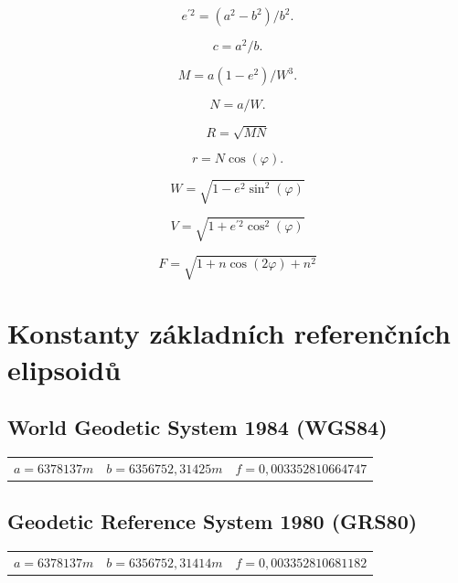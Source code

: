 \documentclass[11pt,a4paper]{article}
\begin{document}
\begin{appendices}
\begin{equation}
e^{'2} = (a^{2}-b^{2})/b^{2}.
\end{equation}

\begin{equation}
c = a^{2}/b.
\end{equation}

\begin{equation}
M = a\left(1-e^{2}\right) / W^{3}.
\end{equation}

\begin{equation}
N = a/W.
\end{equation}

\begin{equation}
R = \sqrt{M N}
\end{equation}

\begin{equation}
r = N\cos{\left(\varphi\right)}.
\end{equation}

\begin{equation}
W = \sqrt{1-e^{2}\sin^{2}{\left(\varphi\right)}}
\end{equation}

\begin{equation}
V = \sqrt{1+e^{'2}\cos^{2}{\left(\varphi\right)}}
\end{equation}

\begin{equation}
F = \sqrt{1+n\cos{\left(2\varphi\right)}+n^{2}}
\end{equation}

\section{Konstanty základních referenčních elipsoidů} \label{appRefEllConst}

\subsection{World Geodetic System 1984 (WGS84)}\label{appRefEllConstWGS84}
\begin{table}[ht!]
\begin{tabular}{c c c}
$a = 6 378 137 m$ & $b = 6 356 752,31425 m$ & $f = 0,00335 28106 64747$ \\
\end{tabular}
\end{table}

\subsection{Geodetic Reference System 1980 (GRS80)}
\begin{table}[ht!]
\begin{tabular}{c c c}
$a = 6 378 137 m$ & $b = 6 356 752,31414 m$ & $f = 0,00335 28106 81182$ \\
\end{tabular}
\end{table}


\end{appendices}
\end{document}
